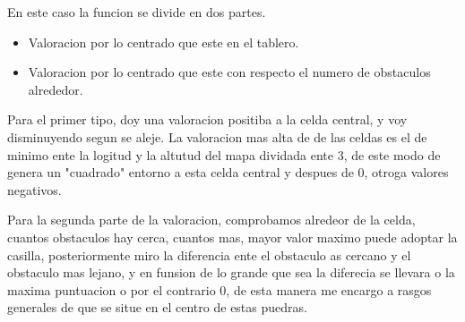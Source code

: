 En este caso la funcion se divide en dos partes. 
\begin{itemize}
    \item Valoracion por lo centrado que este en el tablero.
    \item Valoracion por lo centrado que este con respecto el numero de obstaculos alrededor.
\end{itemize}
Para el primer tipo, doy una valoracion positiba a la celda central, y voy disminuyendo segun se aleje. La valoracion mas alta de de las celdas es el de minimo ente la logitud y la altutud del mapa dividada ente 3, de este modo de genera un "cuadrado" entorno a esta celda central y despues de 0, otroga valores negativos.

Para la segunda parte de la valoracion, comprobamos alredeor de la celda, cuantos obstaculos hay cerca, cuantos mas, mayor valor maximo puede adoptar la casilla, posteriormente miro la diferencia ente el obstaculo as cercano y el obstaculo mas lejano, y en funsion de lo grande que sea la diferecia se llevara o la maxima puntuacion o por el contrario 0, de esta manera me encargo a rasgos generales de que se situe en el centro de estas puedras.
